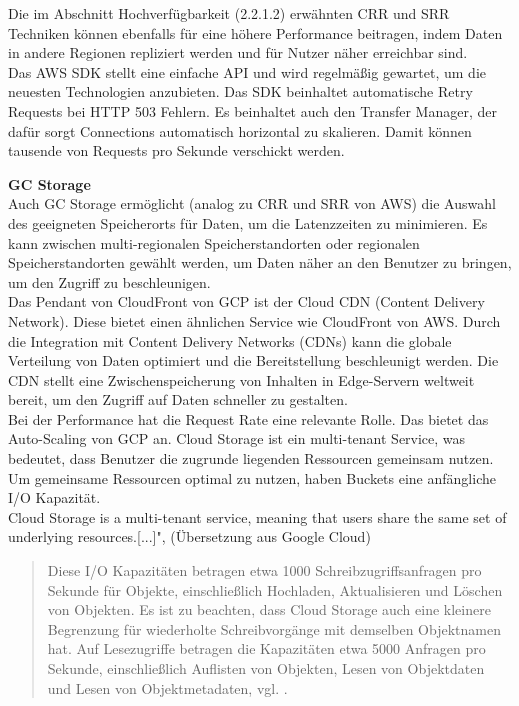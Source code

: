 Die im Abschnitt Hochverfügbarkeit (2.2.1.2) erwähnten CRR und SRR Techniken können ebenfalls für eine höhere Performance beitragen, indem Daten in andere Regionen repliziert werden und für Nutzer näher erreichbar sind.\\

Das AWS SDK stellt eine einfache API und wird regelmäßig gewartet, um die neuesten Technologien anzubieten. Das SDK beinhaltet automatische Retry Requests bei HTTP 503 Fehlern. Es beinhaltet auch den Transfer Manager, der dafür sorgt Connections automatisch horizontal zu skalieren. Damit können tausende von Requests pro Sekunde verschickt werden.

\newpage

\textbf{GC Storage}\\

Auch GC Storage ermöglicht (analog zu CRR und SRR von AWS) die Auswahl des geeigneten Speicherorts für Daten, um die Latenzzeiten zu minimieren. Es kann zwischen multi-regionalen Speicherstandorten oder regionalen Speicherstandorten gewählt werden, um Daten näher an den Benutzer zu bringen, um den Zugriff zu beschleunigen.\\ 

Das Pendant von CloudFront von GCP ist der Cloud CDN (Content Delivery Network). Diese bietet einen ähnlichen Service wie CloudFront von AWS. Durch die Integration mit Content Delivery Networks (CDNs) kann die globale Verteilung von Daten optimiert und die Bereitstellung beschleunigt werden. Die CDN stellt eine Zwischenspeicherung von Inhalten in Edge-Servern weltweit bereit, um den Zugriff auf Daten schneller zu gestalten.\\

Bei der Performance hat die Request Rate eine relevante Rolle. Das bietet das Auto-Scaling von GCP an. Cloud Storage ist ein multi-tenant Service, was bedeutet, dass Benutzer die zugrunde liegenden Ressourcen gemeinsam nutzen. Um gemeinsame Ressourcen optimal zu nutzen, haben Buckets eine anfängliche I/O Kapazität.\\ \glqq Cloud Storage is a multi-tenant service, meaning that users share the same set of underlying resources.[...]", \cite{gcp-autoscale} (Übersetzung aus Google Cloud)

 \begin{quote}
 	Diese I/O Kapazitäten betragen etwa 1000 Schreibzugriffsanfragen pro Sekunde für Objekte, einschließlich Hochladen, Aktualisieren und Löschen von Objekten. Es ist zu beachten, dass Cloud Storage auch eine kleinere Begrenzung für wiederholte Schreibvorgänge mit demselben Objektnamen hat. Auf Lesezugriffe betragen die Kapazitäten etwa 5000 Anfragen pro Sekunde, einschließlich Auflisten von Objekten, Lesen von Objektdaten und Lesen von Objektmetadaten, vgl. \cite{gcp-autoscale}.
 \end{quote}
 
